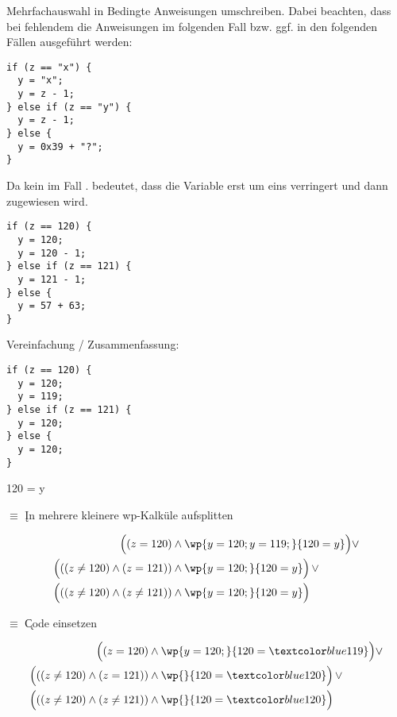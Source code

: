 \documentclass{bschlangaul-aufgabe}
\begin{document}
\begin{liAntwort}
Mehrfachauswahl in Bedingte Anweisungen umschreiben. Dabei beachten,
dass bei fehlendem  die Anweisungen im folgenden Fall
bzw. ggf. in den folgenden Fällen ausgeführt werden:

\begin{verbatim}
if (z == "x") {
  y = "x";
  y = z - 1;
} else if (z == "y") {
  y = z - 1;
} else {
  y = 0x39 + "?";
}
\end{verbatim}

\noindent
Da kein  im Fall .
 bedeutet, dass die Variable erst um eins verringert und
dann zugewiesen wird.

\begin{verbatim}
if (z == 120) {
  y = 120;
  y = 120 - 1;
} else if (z == 121) {
  y = 121 - 1;
} else {
  y = 57 + 63;
}
\end{verbatim}

\noindent
Vereinfachung / Zusammenfassung:

\begin{verbatim}
if (z == 120) {
  y = 120;
  y = 119;
} else if (z == 121) {
  y = 120;
} else {
  y = 120;
}
\end{verbatim}

{120 = y}

\bigskip

$\equiv$ \k{In mehrere kleinere wp-Kalküle aufsplitten}

\begin{align*}
\Bigl( (z = 120) & \land \wp{y=120;y=119;}{120 = y} \Bigr) \lor \\
\Bigl( ((z \neq 120) \land (z = 121)) & \land \wp{y=120;}{120 = y} \Bigr) \, \lor \\
\Bigl( ((z \neq 120) \land (z \neq 121)) & \land \wp{y=120;}{120 = y} \Bigr) \\
\end{align*}

$\equiv$ \k{Code einsetzen}

\begin{align*}
\Bigl( (z = 120) & \land \wp{y=120;}{120 = \m{119}} \Bigr) \lor \\
\Bigl( ((z \neq 120) \land (z = 121)) & \land \wp{}{120 = \m{120}} \Bigr) \, \lor \\
\Bigl( ((z \neq 120) \land (z \neq 121)) & \land \wp{}{120 = \m{120}} \Bigr) \\
\end{align*}


\end{liAntwort}
\end{document}
